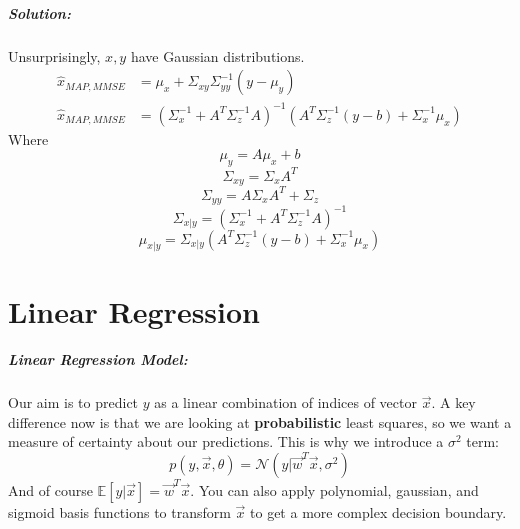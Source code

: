 \documentclass[a4paper,12pt]{report}
\begin{document}
\paragraph{Solution: } Unsurprisingly, $x,y$ have Gaussian distributions.
\begin{equation}
\begin{split}
\hat x_{MAP, MMSE} &= \mu_x + \Sigma_{xy}\Sigma_{yy}^{-1}(y-\mu_y) \\
\hat x_{MAP, MMSE} &= (\Sigma_x^{-1} + A^T \Sigma_z^{-1} A)^{-1} (A^T \Sigma_z^{-1}(y-b) + \Sigma_x^{-1}\mu_x)
\end{split}
\end{equation}
Where
\begin{equation}
\mu_y = A\mu_x + b
\end{equation}
\begin{equation}
\Sigma_{xy} = \Sigma_x A^T
\end{equation}
\begin{equation}
\Sigma_{yy} = A\Sigma_xA^T + \Sigma_z
\end{equation}
\begin{equation}
\Sigma_{x|y} = (\Sigma_x^{-1} + A^T\Sigma_z^{-1}A)^{-1}
\end{equation}
\begin{equation}
\mu_{x | y} = \Sigma_{x|y}(A^T \Sigma_z^{-1}(y-b) + \Sigma_x^{-1}\mu_x)
\end{equation}




\chapter{Linear Regression}

\paragraph{Linear Regression Model: } Our aim is to predict $y$ as a linear combination of indices of vector $\vec x$. A key difference now is that we are looking at \textbf{probabilistic} least squares, so we want a measure of certainty about our predictions. This is why we introduce a $\sigma^2$ term:
\begin{equation}
p(y, \vec x, \theta) = \mathcal N(y | \vec w^T\vec x, \sigma^2)
\end{equation}
And of course $\mathbb E[y|\vec x] = \vec w^T \vec x$. You can also apply polynomial, gaussian, and sigmoid basis functions to transform $\vec x$ to get a more complex decision boundary.
\end{document}
